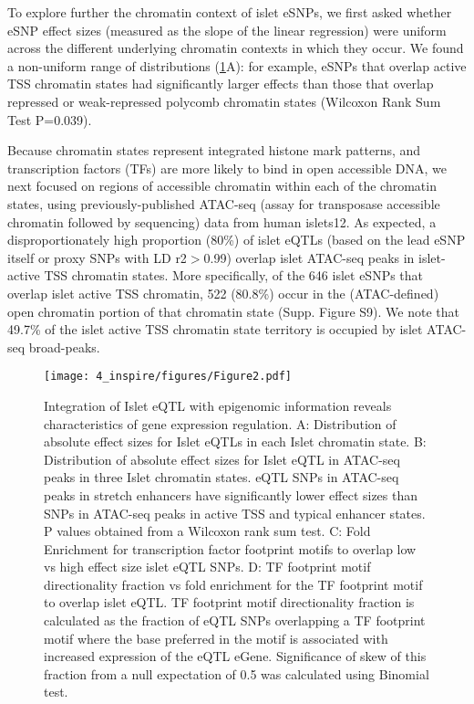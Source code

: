To explore further the chromatin context of islet eSNPs, we first asked whether eSNP effect sizes (measured as the slope of the linear regression) were uniform across the different underlying chromatin contexts in which they occur. We found a non-uniform range of distributions (\ref{fig:c4_f2}A): for example, eSNPs that overlap active TSS chromatin states had significantly larger effects than those that overlap repressed or weak-repressed polycomb chromatin states (Wilcoxon Rank Sum Test P=0.039). 

Because chromatin states represent integrated histone mark patterns, and transcription factors (TFs) are more likely to bind in open accessible DNA, we next focused on regions of accessible chromatin within each of the chromatin states, using previously-published ATAC-seq (assay for transposase accessible chromatin followed by sequencing) data from human islets12. As expected, a disproportionately high proportion (80\%) of islet eQTLs (based on the lead eSNP itself or proxy SNPs with LD r2$>$0.99) overlap islet ATAC-seq peaks in islet-active TSS chromatin states. More specifically, of the 646 islet eSNPs that overlap islet active TSS chromatin, 522 (80.8\%) occur in the (ATAC-defined) open chromatin portion of that chromatin state (Supp. Figure S9). We note that 49.7\% of the islet active TSS chromatin state territory is occupied by islet ATAC-seq broad-peaks.

\begin{figure}
    \centering
    \texttt{[image: 4\_inspire/figures/Figure2.pdf]}
    \caption{Integration of Islet eQTL with epigenomic information reveals characteristics of gene expression regulation. A: Distribution of absolute effect sizes for Islet eQTLs in each Islet chromatin state. B: Distribution of absolute effect sizes for Islet eQTL in ATAC-seq peaks in three Islet chromatin states. eQTL SNPs in ATAC-seq peaks in stretch enhancers have significantly lower effect sizes than SNPs in ATAC-seq peaks in active TSS and typical enhancer states. P values obtained from a Wilcoxon rank sum test. C: Fold Enrichment for transcription factor footprint motifs to overlap low vs high effect size islet eQTL SNPs. D: TF footprint motif directionality fraction vs fold enrichment for the TF footprint motif to overlap islet eQTL. TF footprint motif directionality fraction is calculated as the fraction of eQTL SNPs overlapping a TF footprint motif where the base preferred in the motif is associated with increased expression of the eQTL eGene. Significance of skew of this fraction from a null expectation of 0.5 was calculated using Binomial test. }
    \label{fig:c4_f2}
  \end{figure}


